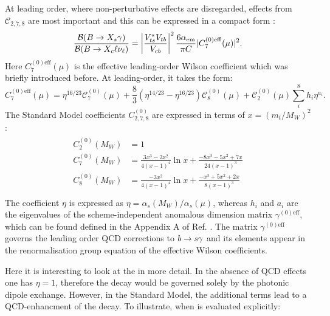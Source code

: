 At leading order, where non-perturbative effects are disregarded, effects from $\mathcal{C}_{2,7,8}$ are most important and this can be expressed in a compact form \cite{Buras:1993xp}:
\begin{equation}\label{eq:total_decay_rate_leading_order}
    \frac{\mathcal{B}({B\rightarrow X_{s} \gamma})}{\mathcal{B}(B\rightarrow X_c\ell\nu_\ell)} = \left|\frac{V_{ts}^*V_{tb}}{V_{cb}}\right|^2\frac{6\alpha_{\mathrm{em}}}{\pi C}|C_{7}^{(0)\mathrm{eff}}(\mu)|^2.
\end{equation}
Here $C_{7}^{(0)\mathrm{eff}}(\mu)$ is the effective leading-order Wilson coefficient which was briefly introduced before.
At leading-order, it takes the form:
\begin{equation}\label{eq:effective_c7}
    C_{7}^{(0)\mathrm{eff}}(\mu) = \eta^{16/23}\mathcal{C}^{(0)}_7(\mu) + \frac{8}{3} \left(\eta^{14/23}-\eta^{16/23}\right)\mathcal{C}^{(0)}_8(\mu) + \mathcal{C}^{(0)}_2(\mu) \sum_i^8h_i\eta^{a_i}.
\end{equation}
The Standard Model coefficients $C_{2,7,8}^{(0)}$ are expressed in terms of $x=(m_t/M_W)^2$:
\begin{align}
    \begin{split}
    C_2^{(0)}(M_W) &= 1\\
    C_7^{(0)}(M_W) &= \frac{3x^3-2x^2}{4(x-1)^4}\ln x + \frac{-8x^3-5x^2+7x}{24(x-1)^3}\\
    C_8^{(0)}(M_W) &= \frac{-3x^2}{4(x-1)^4}\ln x + \frac{-x^3+5x^2+2x}{8(x-1)^3}\\
    \end{split}
\end{align}
The coefficient $\eta$ is expressed as $\eta=\alpha_s(M_W)/\alpha_s(\mu)$, whereas $h_i$ and $a_i$ are the eigenvalues of the scheme-independent anomalous dimension matrix $\gamma^{(0)\mathrm{eff}}$, which can be found defined in the Appendix A of Ref. \cite{Buras:1993xp}.
The matrix $\gamma^{(0)\mathrm{eff}}$ governs the leading order QCD corrections to $b\rightarrow s\gamma$ and its elements appear in the renormalisation group equation of the effective Wilson coefficients.

Here it is interesting to look at the  in more detail. 
In the absence of QCD effects one has $\eta=1$, therefore the \BtoXsgamma decay would be governed solely by the photonic dipole exchange.
However, in the Standard Model, the additional terms lead to a QCD-enhancment of the decay.
To illustrate, when  is evaluated explicitly:


